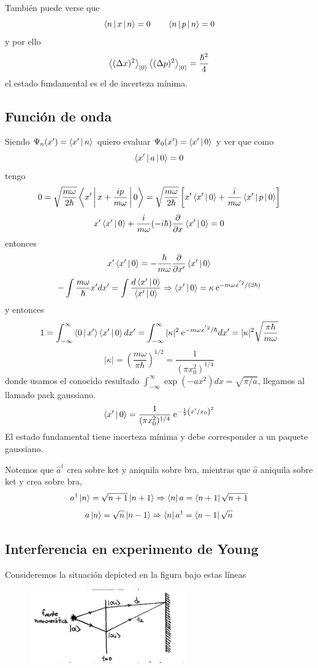 \documentclass[10pt,oneside]{CBFT_book}
\begin{document}
También puede verse que 
\[
	\Braket{n|x|n}= 0 \qquad \Braket{n|p|n}= 0
\]
y por ello 
\[
	\Braket{(\Delta x)^2}_{\Ket{0}} \Braket{(\Delta p)^2}_{\Ket{0}} = \frac{\hbar^2}{4} 
\]
el estado fundamental es el de incerteza mínima.

\subsection{Función de onda}

Siendo $\Psi_n(x') = \Braket{x'|n}$ quiero evaluar $\Psi_0(x') = \Braket{x'|0}$ y ver que como 
\[
	\Braket{x'|a|0}= 0 
\]
tengo 
\[
	0 = \sqrt{ \frac{m\omega}{2\hbar} } \Braket{x'|x+\frac{ip}{m\omega}|0} =
	\sqrt{ \frac{m\omega}{2\hbar} } \left[ x'\Braket{x'|0} + \frac{i}{m\omega}\Braket{x'|p|0} \right]
\]
\[
	x' \Braket{x'|0} + \frac{i}{m\omega} (-i\hbar) \frac{\partial^{\hspace{-0.05em}} {}}{\partial {x}^{\hspace{-0.05em}}} \Braket{x'|0} = 0
\]
entonces 
\[
	x' \Braket{x'|0} = - \frac{\hbar}{m\omega} \frac{\partial^{\hspace{-0.05em}} {}}{\partial {x'}^{\hspace{-0.05em}}}\Braket{x'|0} 
\]
\[
	- \int \frac{m\omega}{\hbar} x' dx' = \int \frac{d \Braket{x'|0}}{\Braket{x'|0}} \Rightarrow 
	\Braket{x'|0} = \kappa \:\mathrm{e}^{-m\omega x^{'2}/(2\hbar)}
\]
y entonces 
\[
	1 = \int_{-\infty}^{\infty} \Braket{0|x'}\Braket{x'|0} dx' = 
	\int_{-\infty}^{\infty} |\kappa|^2 \:\mathrm{e}^{-m\omega x^{'2}/\hbar} dx' =
	|\kappa|^2 \sqrt{\frac{\pi\hbar}{m\omega}} 
\]
\[
	|\kappa| = \left( \frac{m\omega}{\pi\hbar} \right)^{1/2} = \frac{1}{(\pi x_0^2)^{1/4}}
\]
donde usamos el conocido resultado $\int_{-\infty}^\infty \exp( - a x^2) dx = \sqrt{\pi/a}$, llegamos al llamado pack 
gaussiano.
\[
	\Braket{x'|0} = \frac{1}{(\pi x_0^2)^{1/4}} \:\mathrm{e}^{-\frac{1}{2}\left( x'/x_0 \right)^2}
\]
El estado fundamental tiene incerteza mínima y debe corresponder a un paquete gaussiano.

Notemos que $\hat{a}^\dagger$ crea sobre ket y aniquila sobre bra, mientras que $\hat{a}$ aniquila sobre ket y crea 
sobre bra,
\[
	a^\dagger \Ket{n} = \sqrt{n+1} \Ket{n+1} \Rightarrow \Bra{n} a = \Bra{n+1} \sqrt{n+1}
\]
\[
	a \Ket{n} = \sqrt{n} \Ket{n-1} \Rightarrow \Bra{n} a^\dagger = \Bra{n-1} \sqrt{n}
\]

\subsection{Interferencia en experimento de Young}

Consideremos la situación depicted en la figura bajo estas líneas

\begin{figure}[htb]
	\begin{center}
	\includegraphics[width=0.6\textwidth]{images/teo2_6.pdf}	 
	\end{center}
	\caption{}
\end{figure} 
\end{document}
